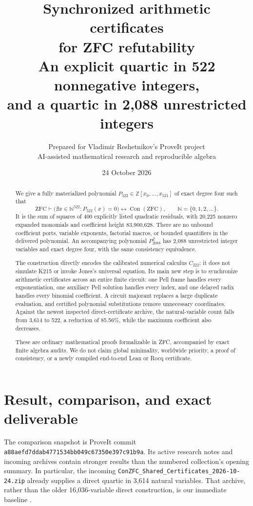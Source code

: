 \documentclass[11pt,letterpaper]{article}
\title{\vspace{-1em}\textbf{Synchronized arithmetic certificates\\for ZFC refutability}\\[0.5em]
\large An explicit quartic in 522 nonnegative integers,\\and a quartic in 2,088 unrestricted integers}
\author{Prepared for Vladimir Reshetnikov's ProveIt project\\\small AI-assisted mathematical research and reproducible algebra}
\date{24 October 2026}
\theoremstyle{definition}\newtheorem{definition}[theorem]{Definition}
\theoremstyle{remark}\newtheorem{remark}[theorem]{Remark}
\newcommand{\N}{\mathbb N}
\newcommand{\Z}{\mathbb Z}
\newcommand{\Con}{\operatorname{Con}}
\newcommand{\ZFC}{\mathrm{ZFC}}
\newcommand{\file}[1]{\texttt{\nolinkurl{#1}}}
\newcommand{\pn}{P_{522}}
\newcommand{\pz}{P^{\Z}_{2088}}
\begin{document}
\maketitle
\begin{abstract}
We give a fully materialized polynomial $\pn\in\Z[x_0,\ldots,x_{521}]$
of exact degree four such that
\[
 \ZFC\vdash
 \bigl(\nexists x\in\N^{522}:\pn(x)=0\bigr)
 \longleftrightarrow \Con(\ZFC),\qquad \N=\{0,1,2,\ldots\}.
\]
It is the sum of squares of 400 explicitly listed quadratic residuals,
with 20,225 nonzero expanded monomials and coefficient height
83,900,628. There are no unbound coefficient ports, variable exponents,
factorial macros, or bounded quantifiers in the delivered polynomial.
An accompanying polynomial $\pz$ has 2,088 unrestricted integer
variables and exact degree four, with the same consistency equivalence.

The construction directly encodes the calibrated numerical calculus
$C_{222}$; it does not simulate K215 or invoke Jones's universal equation.
Its main new step is to synchronize arithmetic certificates across an
entire finite circuit: one Pell frame handles every exponentiation, one
auxiliary Pell solution handles every index, and one delayed radix handles
every binomial coefficient. A circuit majorant replaces a large duplicate
evaluation, and certified polynomial substitutions remove unnecessary
coordinates. Against the newest inspected direct-certificate archive,
the natural-variable count falls from 3,614 to 522, a reduction of
85.56\%, while the maximum coefficient also decreases.

These are ordinary mathematical proofs formalizable in ZFC, accompanied
by exact finite algebra audits. We do not claim global minimality,
worldwide priority, a proof of consistency, or a newly compiled
end-to-end Lean or Rocq certificate.
\end{abstract}

\section{Result, comparison, and exact deliverable}

The comparison snapshot is ProveIt commit
\file{a88aefd7ddab4771534bb049c67350e397c91b9a}. Its active research
notes and incoming archives contain stronger results than the numbered
collection's opening summary. In particular, the incoming
\file{ConZFC_Shared_Certificates_2026-10-24.zip} already supplies a direct
quartic in 3,614 natural variables. That archive, rather than the older
16,036-variable direct construction, is our immediate baseline
\cite{repository,latest,shared}.
\end{document}
